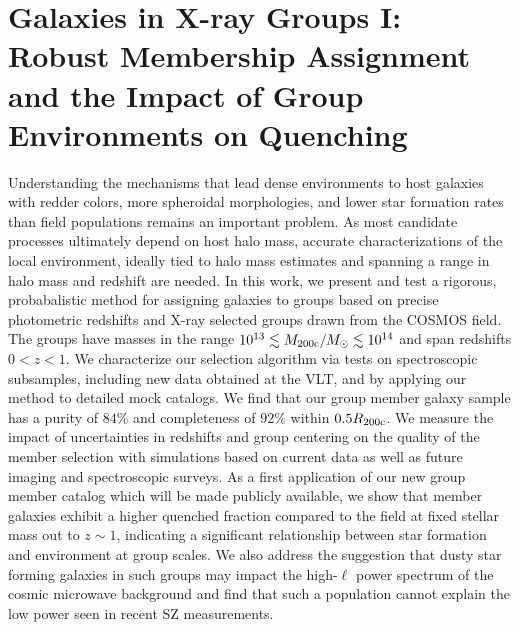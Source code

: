  \newcommand{\eg}{{e.g.}}
 \newcommand{\cf}{{c.f.}}
 \newcommand{\ie}{{i.e.}}
 \newcommand{\etc}{{etc.}}
 \newcommand{\sn}{S{\rm /}N}
 \newcommand{\rmd}{{\rm d}}
 \newcommand{\Msol}{\mbox{$M_{\odot}$}}
 \newcommand{\msun}{\mbox{$M_{\odot}$}}
 \newcommand{\Msun}{\mbox{${\bf M_{\odot} }$}}
 \newcommand{\Lsol}{\mbox{$L_{\odot}$}}
 \newcommand{\lsun}{\mbox{$L_{\odot}$}}
 \newcommand{\ergsec}{\mbox{erg s$^{-1}$}}
 \newcommand{\rvir}{\mbox{$R_{200\rm{c}}$}}
 \newcommand{\mvir}{\mbox{$M_{200\rm{c}}$}}
\newcommand{\zp}{\mbox{$z_{\rm p}$}}
 \newcommand{\zs}{\mbox{$z_{\rm s}$}}
\newcommand{\zG}{\mbox{$z_{\rm G}$}}
\newcommand{\pz}{\mbox{$\mathcal{P}(z)$}}
\newcommand{\flux}{erg cm$^{-2}$ s$^{-1}$ }
\newcommand{\nuvr}{{$(\rm{NUV} - r^+)$ }}

\chapter{Galaxies in X-ray Groups I: 
Robust Membership Assignment and 
the Impact of Group Environments on Quenching}

\label{chap:catalog}

Understanding the mechanisms that lead dense environments to host
galaxies with redder colors, more spheroidal morphologies, and lower
star formation rates than field populations remains an important
problem. As most candidate processes ultimately depend on host halo
mass, accurate characterizations of the local environment, ideally
tied to halo mass estimates and spanning a range in halo mass and
redshift are needed.  In this work, we present and test a rigorous,
probabalistic method for assigning galaxies to groups based on precise
photometric redshifts and X-ray selected groups drawn from the COSMOS
field.  The groups have masses in the range $10^{13} \lesssim
M_{200\rm{c}}/M_{\odot} \lesssim 10^{14}$ and span redshifts
$0<z<1$. We characterize our selection algorithm via tests on
spectroscopic subsamples, including new data obtained at the VLT, and
by applying our method to detailed mock catalogs.  We find 
that our group member galaxy sample has a purity of $84\%$ and
completeness of $92\%$ within $0.5\rvir$. We measure the impact of
uncertainties in redshifts and group centering on the quality of the
member selection with simulations based on current data as well as
future imaging and spectroscopic surveys. As a first application of
our new group member catalog which will be made publicly available, we
show that member galaxies exhibit a higher quenched fraction compared
to the field at fixed stellar mass out to $z \sim 1$, indicating a
significant relationship between star formation and environment at
group scales.  We also address the suggestion that dusty star forming
galaxies in such groups may impact the high-$\ell$ power spectrum of
the cosmic microwave background and find that such a population cannot
explain the low power seen in recent SZ measurements. 
 

